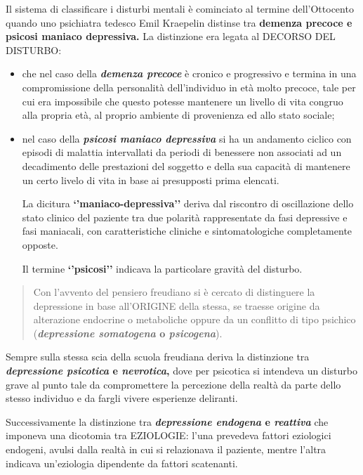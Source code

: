 \documentclass[]{article}
\begin{document}
Il sistema di classificare i disturbi mentali è cominciato al termine
dell'Ottocento quando uno psichiatra tedesco Emil Kraepelin distinse tra
\textbf{demenza precoce e psicosi maniaco depressiva.} La distinzione
era legata al DECORSO DEL DISTURBO:

\begin{itemize}
\item
  che nel caso della \emph{\textbf{demenza precoce}} è cronico e
  progressivo e termina in una compromissione della personalità
  dell'individuo in età molto precoce, tale per cui era impossibile che
  questo potesse mantenere un livello di vita congruo alla propria età,
  al proprio ambiente di provenienza ed allo stato sociale;
\item
  nel caso della \emph{\textbf{psicosi maniaco depressiva}} si ha un
  andamento ciclico con episodi di malattia intervallati da periodi di
  benessere non associati ad un decadimento delle prestazioni del
  soggetto e della sua capacità di mantenere un certo livelo di vita in
  base ai presupposti prima elencati.

  La dicitura \textbf{`'maniaco-depressiva''} deriva dal riscontro di
  oscillazione dello stato clinico del paziente tra due polarità
  rappresentate da fasi depressive e fasi maniacali, con caratteristiche
  cliniche e sintomatologiche completamente opposte.

  Il termine \textbf{`'psicosi''} indicava la particolare gravità del
  disturbo.
\end{itemize}

\begin{quote}
Con l'avvento del pensiero freudiano si è cercato di distinguere la
depressione in base all'ORIGINE della stessa, se traesse origine da
alterazione endocrine o metaboliche oppure da un conflitto di tipo
psichico (\textbf{\emph{depressione somatogena} o \emph{psicogena}}).
\end{quote}

Sempre sulla stessa scia della scuola freudiana deriva la distinzione
tra \textbf{\emph{depressione psicotica} e \emph{nevrotica},} dove per
psicotica si intendeva un disturbo grave al punto tale da compromettere
la percezione della realtà da parte dello stesso individuo e da fargli
vivere esperienze deliranti.

Successivamente la distinzione tra \textbf{\emph{depressione endogena} e
\emph{reattiva}} che imponeva una dicotomia tra EZIOLOGIE: l'una
prevedeva fattori eziologici endogeni, avulsi dalla realtà in cui si
relazionava il paziente, mentre l'altra indicava un'eziologia dipendente
da fattori scatenanti.
\end{document}
